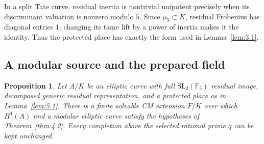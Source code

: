 \documentclass[11pt,a4paper]{article}
\newtheorem{proposition}[theorem]{Proposition}
\numberwithin{equation}{section}
\begin{document}
In a split Tate curve, residual inertia is nontrivial unipotent precisely when its discriminant valuation is nonzero modulo \(5\). Since \(\mu_5\subset K\), residual Frobenius has diagonal entries \(1\); changing its tame lift by a power of inertia makes it the identity. Thus the protected place has exactly the form used in Lemma~\ref{lem:3.1}.

\subsection*{A modular source and the prepared field}

\begin{proposition}\label{prop:5.2}
Let \(A/K\) be an elliptic curve with full \(\mathrm{SL}_2(\mathbb F_5)\) residual image, decomposed generic residual representation, and a protected place as in Lemma~\ref{lem:5.1}. There is a finite solvable CM extension \(F/K\) over which \(H^1(A)\) and a modular elliptic curve satisfy the hypotheses of Theorem~\ref{thm:4.2}. Every completion above the selected rational prime \(q\) can be kept unchanged.
\end{proposition}
\end{document}
